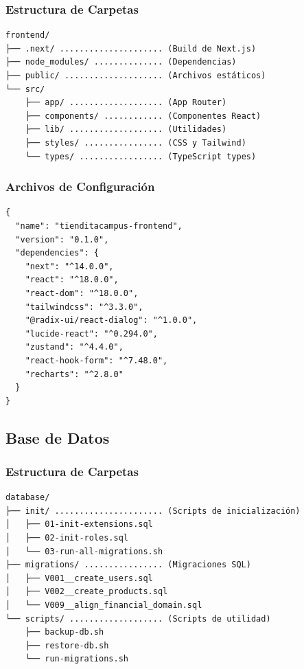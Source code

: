 \documentclass[12pt,a4paper]{article}
\begin{document}
\subsubsection{Estructura de Carpetas}

\begin{verbatim}
frontend/
├── .next/ ..................... (Build de Next.js)
├── node_modules/ .............. (Dependencias)
├── public/ .................... (Archivos estáticos)
└── src/
    ├── app/ ................... (App Router)
    ├── components/ ............ (Componentes React)
    ├── lib/ ................... (Utilidades)
    ├── styles/ ................ (CSS y Tailwind)
    └── types/ ................. (TypeScript types)
\end{verbatim}

\subsubsection{Archivos de Configuración}
\begin{lstlisting}[caption=package.json - Dependencias Frontend]
{
  "name": "tienditacampus-frontend",
  "version": "0.1.0",
  "dependencies": {
    "next": "^14.0.0",
    "react": "^18.0.0",
    "react-dom": "^18.0.0",
    "tailwindcss": "^3.3.0",
    "@radix-ui/react-dialog": "^1.0.0",
    "lucide-react": "^0.294.0",
    "zustand": "^4.4.0",
    "react-hook-form": "^7.48.0",
    "recharts": "^2.8.0"
  }
}
\end{lstlisting}

\subsection{Base de Datos}

\subsubsection{Estructura de Carpetas}

\begin{verbatim}
database/
├── init/ ...................... (Scripts de inicialización)
│   ├── 01-init-extensions.sql
│   ├── 02-init-roles.sql
│   └── 03-run-all-migrations.sh
├── migrations/ ................ (Migraciones SQL)
│   ├── V001__create_users.sql
│   ├── V002__create_products.sql
│   └── V009__align_financial_domain.sql
└── scripts/ ................... (Scripts de utilidad)
    ├── backup-db.sh
    ├── restore-db.sh
    └── run-migrations.sh
\end{verbatim}
\end{document}
